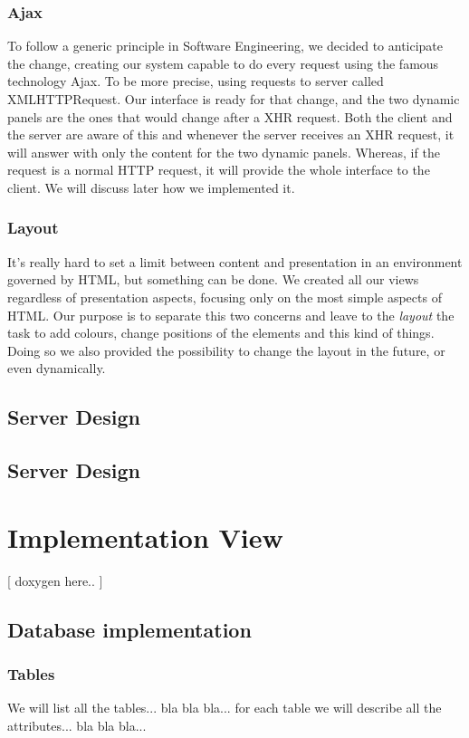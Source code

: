 \documentclass[12pt]{report}
\begin{document}
\subsection{Ajax}
To follow a generic principle in Software Engineering, we decided to anticipate the change, creating our system capable to do every request using the famous technology Ajax. To be more precise, using requests to server called XMLHTTPRequest. Our interface is ready for that change, and the two dynamic panels are the ones that would change after a XHR request. Both the client and the server are aware of this and whenever the server receives an XHR request, it will answer with only the content for the two dynamic panels. Whereas, if the request is a normal HTTP request, it will provide the whole interface to the client. We will discuss later how we implemented it.

\subsection{Layout}
It's really hard to set a limit between content and presentation in an environment governed by HTML, but something can be done. We created all our views regardless of presentation aspects, focusing only on the most simple aspects of HTML. Our purpose is to separate this two concerns and leave to the \emph{layout} the task to add colours, change positions of the elements and this kind of things. Doing so we also provided the possibility to change the layout in the future, or even dynamically.

\section{Server Design}


\section{Server Design}

\chapter{Implementation View}
[ doxygen here.. ]

\section{Database implementation}
\subsection{Tables}
We will list all the tables... bla bla bla... for each table we will describe all the attributes... bla bla bla...
\end{document}
